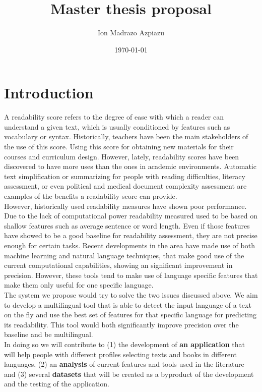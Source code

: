 \documentclass[12pt]{article}
\title{Master thesis proposal}
\author{Ion Madrazo Azpiazu}
\date{\today}
\begin{document}
\maketitle
\section{Introduction}
A readability score refers to the degree of ease with which a reader can understand a given text, which is usually conditioned by features such as vocabulary or syntax. Historically, teachers have been the main stakeholders of the use of this score. Using this score for obtaining new materials for their courses and curriculum design. However, lately, readability scores have been discovered to have more uses than the ones in academic environments. Automatic text simplification or summarizing for people with reading difficulties, literacy assessment, or even political and medical document complexity assessment are examples of the benefits a readability score can provide.\\

However, historically used readability measures have shown poor performance. Due to the lack of computational power readability measured used to be based on shallow features such as average sentence or word length. Even if those features have showed to be a good baseline for readability assessment, they are not precise enough for certain tasks. Recent developments in the area have made use of both machine learning and natural language techniques, that make good use of the current computational capabilities, showing an significant improvement in precision. However, these tools tend to make use of language specific features that make them only useful for one specific language.\\

The system we propose would try to solve the two issues discussed above. We aim to develop a multilingual tool that is able to detect the input language of a text on the fly and use the best set of features for that specific language for predicting its readability. This tool would both significantly improve precision over the baseline and be multilingual.\\

In doing so we will contribute to (1) the development of \textbf{an application} that will help people with different profiles selecting texts and books in different languages, (2) an \textbf{analysis} of current features and tools used in the literature and (3) several \textbf{datasets} that will be created as a byproduct of the development and the testing of the application.\\
\end{document}
